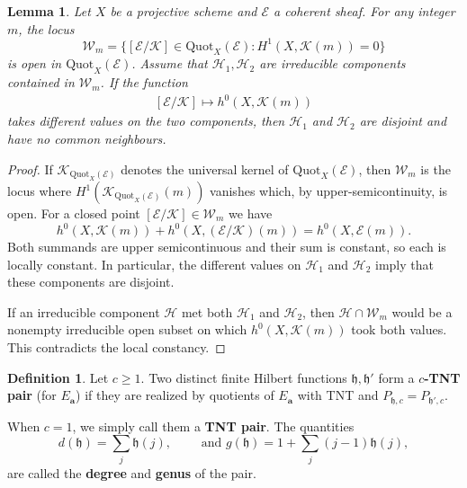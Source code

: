 \documentclass[leqno,11pt,a4paper]{amsart}
\newtheorem{lemma}[lemma]{Lemma}
\theoremstyle{definition}
\newtheorem{definition}[definition]{Definition}
\numberwithin{equation}{section}
\newcommand{\bfa}{\mathbf{a}}
\newcommand{\Quot}{\mathrm{Quot}}
\newcommand{\mfh}{\mathfrak{h}}
\newcommand{\EE}{\mathscr{E}}
\newcommand{\KK}{\mathscr{K}}
\newcommand{\HH}{\mathcal{H}}
\begin{document}
\begin{lemma}\label{TNT_separation}
Let $X$ be a projective scheme and $\EE$ a coherent sheaf.
For any integer $m$, the locus
$$
\mathcal{W}_m=\{[\EE/\KK] \in \Quot_X(\EE) :H^1(X,\KK(m))=0\}
$$
is open in $\Quot_X(\EE)$. 
Assume that $\HH_1,\HH_2$ are irreducible components contained in $\mathcal{W}_m$. 
If the function 
\begin{align} \label{dim_0_fun}
[\EE/\KK] \mapsto h^0(X,\KK(m))
\end{align}
takes different values on the two components, then $\HH_1$ and $\HH_2$ are disjoint and have no common neighbours.
\end{lemma}
\begin{proof}
If $\KK_{\Quot_X(\EE)}$ denotes the universal kernel of $\Quot_X(\EE)$, then $\mathcal{W}_m$ is the locus where $H^1(\KK_{\Quot_X(\EE)}(m))$ vanishes which, by upper-semicontinuity, is open. 
For a closed point $[\EE/\KK]  \in \mathcal{W}_m$ we have 
$$
h^0(X,\KK(m))+h^0(X,(\EE/\KK)(m))=h^0(X,\EE(m)).
$$
Both summands are upper semicontinuous and their sum is constant, so each is locally constant. 
In particular, the different values on $\HH_1$ and $\HH_2$ imply that these components are disjoint.

If an irreducible component $\HH$ met both $\HH_1$ and $\HH_2$, then $\HH\cap\mathcal W_m$ would be a nonempty irreducible open subset on which $h^0(X,\KK(m))$ took both values. 
This contradicts the local constancy.
\end{proof}

\begin{definition}\label{TNT_pair}
Let $c\geq1$. 
Two distinct finite Hilbert functions $\mfh,\mfh'$ form a \textbf{$c$-TNT pair} (for $E_{\bfa}$) if they are realized by quotients of $E_{\bfa}$ with TNT and $P_{\mfh,c}=P_{\mfh',c}$. 

When $c=1$, we simply call them a \textbf{TNT pair}. The quantities
$$
d(\mfh)=\sum_j\mfh(j),
\qquad \text{ and }
g(\mfh)=1+\sum_j(j-1)\mfh(j),
$$
are called the \textbf{degree} and \textbf{genus} of the pair.
\end{definition}
\end{document}

